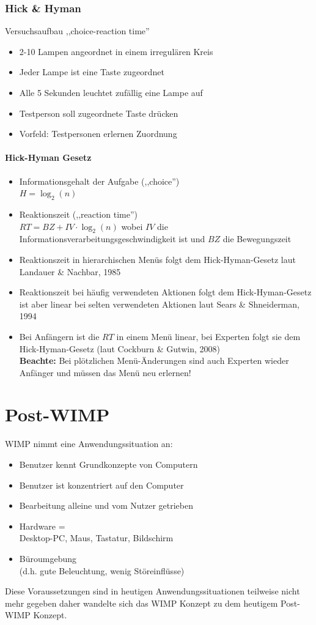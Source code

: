 \documentclass
[
	8pt,		%
	ngerman,	%
	a4paper,	%
	landscape,	%
	final		%
]{extarticle}
\begin{document}
\begin{multicols*}{4}
	\subsubsection{Hick \& Hyman}
	Versuchsaufbau ,,choice-reaction time''
	\begin{itemize}
		\item 2-10 Lampen angeordnet in einem irregulären Kreis
		\item Jeder Lampe ist eine Taste zugeordnet
		\item Alle 5 Sekunden leuchtet zufällig eine Lampe auf
		\item Testperson soll zugeordnete Taste drücken
		\item Vorfeld: Testpersonen erlernen Zuordnung
	\end{itemize}
	\paragraph{Hick-Hyman Gesetz}
	\begin{itemize}
		\item Informationsgehalt der Aufgabe (,,choice'')\\
		      \(H = \log_{2}(n)\)
		\item Reaktionszeit (,,reaction time'')\\
		      \(RT = BZ + IV \cdot \log_{2}(n)\)
		      wobei \(IV\) die Informationsverarbeitungsgeschwindigkeit ist
		      und \(BZ\) die Bewegungszeit
		\item Reaktionszeit in hierarchischen Menüs folgt dem Hick-Hyman-Gesetz
		      laut Landauer \& Nachbar, 1985
		\item Reaktionszeit bei häufig verwendeten Aktionen folgt dem
		      Hick-Hyman-Gesetz ist aber linear bei selten verwendeten Aktionen
		      laut Sears \& Shneiderman, 1994
		\item Bei Anfängern ist die \(RT\) in einem Menü linear, bei Experten
		      folgt sie dem Hick-Hyman-Gesetz (laut Cockburn \& Gutwin, 2008) \\
		      \textbf{Beachte:} Bei plötzlichen Menü-Änderungen sind auch
		      Experten wieder Anfänger und müssen das Menü neu erlernen!
	\end{itemize}
	\section{Post-WIMP}
	WIMP nimmt eine Anwendungssituation an:
	\begin{itemize}
		\item Benutzer kennt Grundkonzepte von Computern
		\item Benutzer ist konzentriert auf den Computer
		\item Bearbeitung alleine und vom Nutzer getrieben
		\item Hardware = \\ Desktop-PC, Maus, Tastatur, Bildschirm
		\item Büroumgebung \\ (d.h. gute Beleuchtung, wenig Störeinflüsse)
	\end{itemize}
	Diese Voraussetzungen sind in heutigen Anwendungssituationen teilweise nicht
	mehr gegeben daher wandelte sich das WIMP Konzept zu dem heutigem Post-WIMP
	Konzept.

\end{multicols*}
\end{document}

